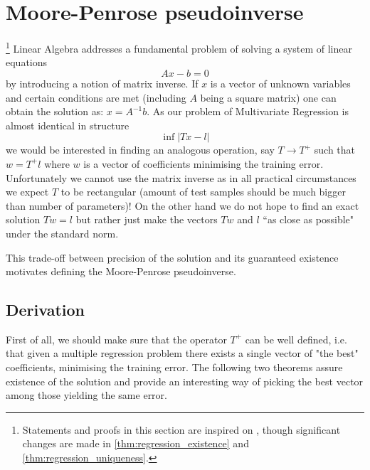 \documentclass[a4paper,11pt]{article}
\theoremstyle{break}
\begin{document}
\section{Moore-Penrose pseudoinverse}
\footnote{Statements and proofs in this section are inspired on \cite[pp15-24]{albert}, though significant changes are made in \ref{thm:regression_existence} and \ref{thm:regression_uniqueness}.}
Linear Algebra addresses a fundamental problem of solving a system of linear equations
$$ A x - b = 0$$
by introducing a notion of matrix inverse. If $x$ is a vector of unknown variables and certain conditions are met (including $A$ being a square matrix) one can obtain the solution as: $ x = A^{-1} b $. As our problem of Multivariate Regression is almost identical in structure
$$ \inf | T x - l | $$
we would be interested in finding an analogous operation, say $ T \to T^+$ such that $ w = T^+ l$ where $w$ is a vector of coefficients minimising the training error. Unfortunately we cannot use the matrix inverse as in all practical circumstances we expect $T$ to be rectangular (amount of test samples should be much bigger than number of parameters)! On the other hand we do not hope to find an exact solution $ T w = l$ but rather just make the vectors $T w$ and $l$ ``as close as possible" under the standard norm.

This trade-off between precision of the solution and its guaranteed existence motivates defining the Moore-Penrose pseudoinverse.

\subsection{Derivation}
First of all, we should make sure that the operator $T^+$ can be well defined, i.e. that given a multiple regression problem there exists a single vector of "the best" coefficients, minimising the training error.
The following two theorems assure existence of the solution and provide an interesting way of picking the best vector among those yielding the same error.
\end{document}
